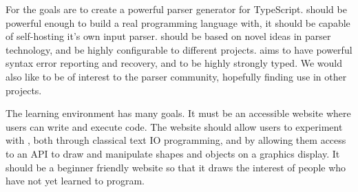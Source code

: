 For \tsPEG{} the goals are to create a powerful parser generator for TypeScript. \tsPEG{} should be powerful enough to build a real programming language with, it should be capable of self-hosting it's own input parser. \tsPEG{} should be based on novel ideas in parser technology, and be highly configurable to different projects. \tsPEG{} aims to have powerful syntax error reporting and recovery, and to be highly strongly typed. We would also like \tsPEG{} to be of interest to the parser community, hopefully finding use in other projects.

The learning environment has many goals. It must be an accessible website where users can write and execute \Setanta{} code. The website should allow users to experiment with \Setanta{}, both through classical text IO programming, and by allowing them access to an API to draw and manipulate shapes and objects on a graphics display. It should be a beginner friendly website so that it draws the interest of people who have not yet learned to program.

